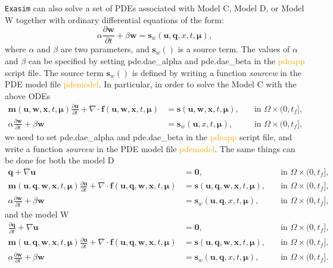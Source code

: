 \documentclass[11pt]{article}
\begin{document}
\texttt{Exasim}  can also solve a set of PDEs associated with Model C, Model D, or Model W together with ordinary differential equations of the form:
\begin{equation}
\label{modela0}
\alpha \frac{\partial \bm w}{\partial t}   +  \beta \bm w  =  \bm s_w(\bm u, \bm q, x, t, \bm \mu) ,
\end{equation}
where $\alpha$ and $\beta$ are two parameters, and $\bm s_w()$ is a source term. The values of $\alpha$ and $\beta$ can be specified by setting pde.dae\_alpha and pde.dae\_beta in the \textcolor{orange}{pdeapp}  script file. The source term $\bm s_w()$ is defined by writing a function {\em sourcew} in the PDE model file \textcolor{orange}{pdemodel}. In particular, in order to solve the Model C with the above ODEs 
\begin{subequations}
\label{modela1}
\begin{alignat}{2}
\bm m(\bm{u},   \bm w, \bm x,t, \bm \mu) \frac{\partial \bm{u}}{\partial t} + \nabla \cdot \bm{f}(\bm{u}, \bm w, \bm x,t, \bm \mu) &=  \bm s(\bm{u},  \bm w,  \bm x,t, \bm \mu), & \quad \mbox{in } \Omega \times (0, t_f], \\
\alpha \frac{\partial \bm w}{\partial t}   +  \beta \bm w & =  \bm s_w(\bm u, x, t, \bm \mu),  & \quad \mbox{in } \Omega \times (0, t_f] ,
\end{alignat}
\end{subequations}
we need to set pde.dae\_alpha and pde.dae\_beta in the \textcolor{orange}{pdeapp}  script file, and write a function {\em sourcew} in the PDE model file \textcolor{orange}{pdemodel}. The same things can be done for both the model D  
\begin{subequations}
\label{modela2}
\begin{alignat}{2}
\bm q + \nabla \bm u & =  \bm 0,  & \quad \mbox{in } \Omega \times (0, t_f], \\
\bm m(\bm{u}, \bm q,  \bm w, \bm x,t, \bm \mu) \frac{\partial \bm{u}}{\partial t} + \nabla \cdot \bm{f}(\bm{u}, \bm q, \bm w, \bm x,t, \bm \mu) &=  \bm s(\bm{u}, \bm q, \bm w,  \bm x,t, \bm \mu), & \quad \mbox{in } \Omega \times (0, t_f], \\
\alpha \frac{\partial \bm w}{\partial t}   +  \beta \bm w & =  \bm s_w(\bm u, \bm q, x, t, \bm \mu),  & \quad \mbox{in } \Omega \times (0, t_f] ,
\end{alignat}
\end{subequations}
and the model W  
\begin{subequations}
\label{modela3}
\begin{alignat}{2}
\frac{\partial \bm q}{\partial t} + \nabla \bm u & =  \bm 0,  & \quad \mbox{in } \Omega \times (0, t_f], \\
\bm m(\bm{u}, \bm q,  \bm w, \bm x,t, \bm \mu) \frac{\partial \bm{u}}{\partial t} + \nabla \cdot \bm{f}(\bm{u}, \bm q, \bm w, \bm x,t, \bm \mu) &=  \bm s(\bm{u}, \bm q, \bm w,  \bm x,t, \bm \mu), & \quad \mbox{in } \Omega \times (0, t_f], \\
\alpha \frac{\partial \bm w}{\partial t}   +  \beta \bm w & =  \bm s_w(\bm u, \bm q, x, t, \bm \mu),  & \quad \mbox{in } \Omega \times (0, t_f] .
\end{alignat}
\end{subequations}
\end{document}
